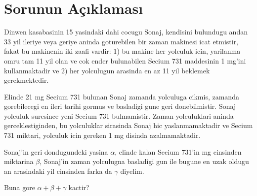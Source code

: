 \vspace{-1mm}
\section{Sorunun A\c{c}{\i}klamas{\i}}
%
%
Dinwen kasabasinin 15 yasindaki dahi cocugu Sonaj, kendisini bulundugu andan 33
yil ileriye veya geriye aninda goturebilen bir zaman makinesi icat etmistir,
fakat bu makinenin iki zaafi vardir: 1) bu makine her yolculuk icin, yarilanma
omru tam 11 yil olan ve cok ender bulunabilen Secium 731 maddesinin 1 mg'ini
kullanmaktadir ve 2) her yolculugun arasinda en az 11 yil beklemek
gerekmektedir.

Elinde 21 mg Secium 731 bulunan Sonaj zamanda yolculuga cikmis, zamanda
gorebilecegi en ileri tarihi gormus ve basladigi gune geri donebilmistir. Sonaj
yolculuk suresince yeni Secium 731 bulmamistir. Zaman yolculuklari aninda
gerceklestiginden, bu yolculuklar sirasinda Sonaj hic yaslanmamaktadir ve Secium
731 miktari, yolculuk icin gereken 1 mg disinda azalmamaktadir.

Sonaj'in geri dondugundeki yasina $\alpha$, elinde kalan Secium 731'in mg
cinsinden miktarina $\beta$, Sonaj'in zaman yolculugna basladigi gun ile bugune 
en uzak oldugu an arasindaki yil cinsinden farka da $\gamma$ diyelim.

Buna gore $\alpha + \beta + \gamma$ kactir?